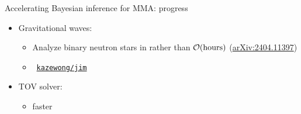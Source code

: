 \documentclass[usenames,dvipsnames,t]{beamer}
\begin{document}
\begin{frame}{Accelerating Bayesian inference for MMA: progress}

  \def\x{4mm}
  \def\y{2mm}

  \begin{itemize}

    \item Gravitational waves: 
    \vspace{\y}
    \begin{itemize}
      \item Analyze binary neutron stars in  rather than $\mathcal{O}(\rm{hours})$ (\href{https://arxiv.org/abs/2404.11397}{arXiv:2404.11397})
      
      \vspace{\y}
      
      \item \faGithub~\href{https://github.com/kazewong/jim}{\texttt{kazewong/jim}}
    \end{itemize}

    \vspace{\x}
    
      
    

    


    \item TOV solver: 
    \vspace{\y}
    \begin{itemize}
      \item {} faster
      

\end{itemize}
\end{itemize}
\end{frame}
\end{document}
